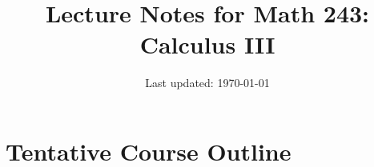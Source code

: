 \documentclass[10pt]{article}
\title{Lecture Notes for Math 243: \\ Calculus III}
\date{Last updated: \today}
\theoremstyle{definition}
\newcommand{\1}[1]{\textbf{1}_{\left[#1\right]}} %
\begin{document}
\maketitle
\tableofcontents
\newpage



\newpage
\setcounter{section}{-1}
\section{Tentative Course Outline}
\end{document}

